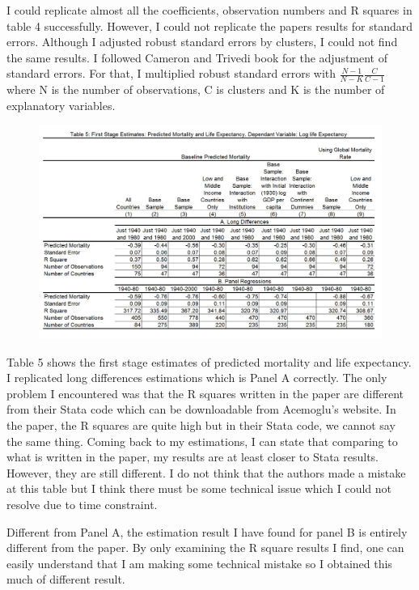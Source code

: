 \documentclass[11pt]{article}
\begin{document}
I could replicate almost all the coefficients, observation numbers and R squares in table 4 successfully. However, I could not replicate the papers results for standard errors. Although I adjusted robust standard errors by clusters, I could not find the same results. I followed Cameron and Trivedi book for the adjustment of standard errors. For that, I multiplied robust standard errors with $\frac{N-1}{N-K}\frac{C}{C-1}$ where N is the number of observations, C is clusters and K is the number of explanatory variables.
\begin{figure} [H]
\centering
\includegraphics[width=\textwidth]{table5}
\label{table5}
\end{figure}
Table 5 shows the first stage estimates of predicted mortality and life expectancy. I replicated long differences estimations which is Panel A correctly. The only problem I encountered was that the R squares written in the paper are different from their Stata code which can be downloadable from Acemoglu's website. In the paper, the R squares are quite high but in their Stata code, we cannot say the same thing. Coming back to my estimations, I can state that comparing to what is written in the paper, my results are at least closer to Stata results. However, they are still different. I do not think that the authors made a mistake at this table but I think there must be some technical issue which I could not resolve due to time constraint.

Different from Panel A, the estimation result I have found for panel B is entirely different from the paper. By only examining the R square results I find, one can easily understand that I am making some technical mistake so I obtained this much of different result. 
\end{document}

